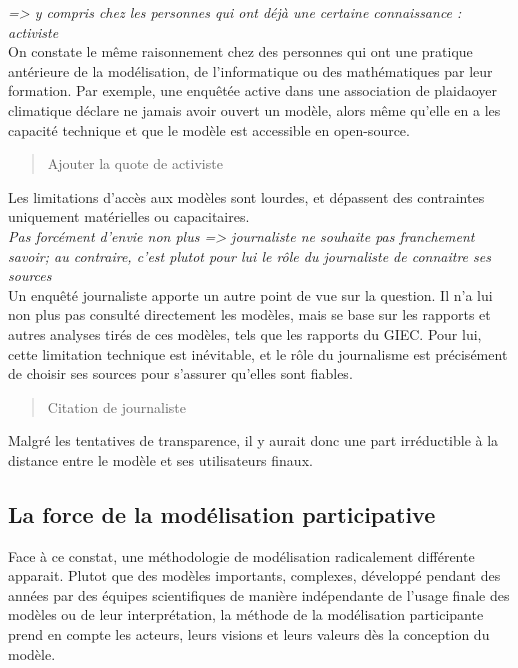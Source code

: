 \textit{=> y compris chez les personnes qui ont déjà une certaine connaissance : activiste} \\


On constate le même raisonnement chez des personnes qui ont une pratique antérieure de la modélisation, de l'informatique ou des mathématiques par leur formation. Par exemple, une enquêtée active dans une association de plaidaoyer climatique déclare ne jamais avoir ouvert un modèle, alors même qu'elle en a les capacité technique et que le modèle est accessible en open-source. 

\begin{quote}
    Ajouter la quote de activiste
\end{quote}

Les limitations d'accès aux modèles sont lourdes, et dépassent des contraintes uniquement matérielles ou capacitaires. \\

\textit{Pas forcément d'envie non plus
=> journaliste ne souhaite pas franchement savoir; au contraire, c'est plutot pour lui le rôle du journaliste de connaitre ses sources} \\

Un enquêté journaliste apporte un autre point de vue sur la question. Il n'a lui non plus pas consulté directement les modèles, mais se base sur les rapports et autres analyses tirés de ces modèles, tels que les rapports du GIEC. Pour lui, cette limitation technique est inévitable, et le rôle du journalisme est précisément de choisir ses sources pour s'assurer qu'elles sont fiables. 

\begin{quote}
    Citation de journaliste
\end{quote}

Malgré les tentatives de transparence, il y aurait donc une part irréductible à la distance entre le modèle et ses utilisateurs finaux. 

\subsection{La force de la modélisation participative}

Face à ce constat, une méthodologie de modélisation radicalement différente apparait. Plutot que des modèles importants, complexes, développé pendant des années par des équipes scientifiques de manière indépendante de l'usage finale des modèles ou de leur interprétation, la méthode de la modélisation participante prend en compte les acteurs, leurs visions et leurs valeurs dès la conception du modèle. \\

